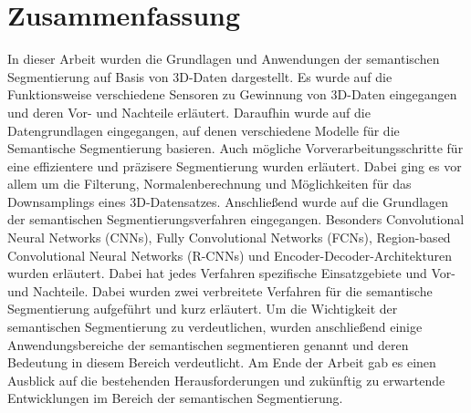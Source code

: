 \chapter{Zusammenfassung}
In dieser Arbeit wurden die Grundlagen und Anwendungen der semantischen
Segmentierung auf Basis von 3D-Daten dargestellt. Es wurde auf die
Funktionsweise verschiedene Sensoren zu Gewinnung von 3D-Daten eingegangen und
deren Vor- und Nachteile erläutert. Daraufhin wurde auf die Datengrundlagen
eingegangen, auf denen verschiedene Modelle für die Semantische Segmentierung
basieren. Auch mögliche Vorverarbeitungsschritte für eine effizientere und
präzisere Segmentierung wurden erläutert. Dabei ging es vor allem um die
Filterung, Normalenberechnung und Möglichkeiten für das Downsamplings eines
3D-Datensatzes. Anschließend wurde auf die Grundlagen der semantischen
Segmentierungsverfahren eingegangen. Besonders Convolutional Neural Networks
(CNNs), Fully Convolutional Networks (FCNs), Region-based Convolutional Neural
Networks (R-CNNs) und Encoder-Decoder-Architekturen wurden erläutert. Dabei hat
jedes Verfahren spezifische Einsatzgebiete und Vor- und Nachteile. Dabei wurden
zwei verbreitete Verfahren für die semantische Segmentierung aufgeführt und
kurz erläutert. Um die Wichtigkeit der semantischen Segmentierung zu
verdeutlichen, wurden anschließend einige Anwendungsbereiche der semantischen
segmentieren genannt und deren Bedeutung in diesem Bereich verdeutlicht. Am
Ende der Arbeit gab es einen Ausblick auf die bestehenden Herausforderungen und zukünftig
zu erwartende Entwicklungen im Bereich der semantischen Segmentierung.